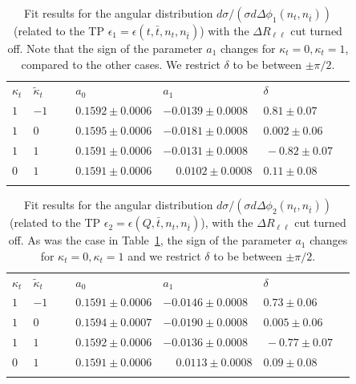 \documentclass[aps,preprint,tightenlines,floatfix,superscriptaddress,nofootinbib,showpacs]{revtex4-1}
\def\tbar{\bar{t}}
\def\kp{\kappa_t}
\begin{document}
\renewcommand{\arraystretch}{1.2}
\begin{table}[H]
\caption{Fit results for the angular distribution $d\sigma/(\sigma
  d\Delta\phi_1(n_t,n_{\tbar}))$ (related to the TP
  $\epsilon_1=\epsilon(t,\tbar,n_t,n_{\tbar})$) with the $\Delta
  R_{\ell\ell}$ cut turned off. Note that the sign of the parameter $a_1$
  changes for $\kp=0,\kp=1$, compared to the
  other cases.  We restrict $\delta$ to be between
    $\pm \pi/2$.}
\label{table3}
\begin{center}
\begin{tabular}{|C{1cm}|C{1cm}||C{3cm}|C{3cm}|C{3cm}|}
\hhline{|=====|}
$\kappa_t$&$\tilde{\kappa}_t$~~&$a_0$~~&$a_1$& $\delta$~~ \\ 
\hhline{|=====|} 
$1$ & $-1$~~~ & $0.1592 \pm 0.0006$ & $-0.0139 \pm 0.0008$ & $0.81 \pm 0.07$ \\[0.6mm]
\hline
$1$ & $0$ & $0.1595 \pm 0.0006$ & $-0.0181 \pm 0.0008$ & $0.002 \pm 0.06\,\,$ \\[0.6mm]
\hline
$1$ & $1$ & $0.1591 \pm 0.0006$ & $-0.0131 \pm 0.0008 $ & $\,-0.82 \pm 0.07\quad$  \\[0.6mm]
\hline
$0$ & $1$ & $0.1591 \pm 0.0006$ & ~~$\,0.0102 \pm 0.0008$ & $0.11 \pm 0.08$ \\
\hhline{|=====|}
\end{tabular}
\end{center} 
\end{table}
\begin{table}[H]
\caption{Fit results for the angular distribution $d\sigma/(\sigma
  d\Delta\phi_2(n_t,n_{\tbar}))$ (related to the TP
  $\epsilon_2=\epsilon(Q,\tbar,n_t,n_{\tbar})$), with the $\Delta
  R_{\ell\ell}$ cut turned off. As was the case in Table~\ref{table3},
  the sign of the parameter $a_1$ changes for
  $\kp=0,\kp=1$ and we restrict $\delta$ to be between
    $\pm \pi/2$.}
\label{table4}
\begin{center}
\begin{tabular}{|C{1cm}|C{1cm}||C{3cm}|C{3cm}|C{3cm}|}
\hhline{|=====|}
$\kappa_t$&$\tilde{\kappa}_t$~~&$a_0$~~&$a_1$& $\delta$~~ \\ 
\hhline{|=====|} 
$1$ & $-1$~~~ & $0.1591 \pm 0.0006$ & $-0.0146 \pm 0.0008$ & $0.73 \pm 0.06$ \\[0.6mm]
\hline
$1$ & $0$ & $0.1594 \pm 0.0007$ & $-0.0190 \pm 0.0008$ & $0.005 \pm 0.06\,\,$ \\[0.6mm]
\hline
$1$ & $1$ & $0.1592 \pm 0.0006$ & $-0.0136 \pm 0.0008 $ & $\,-0.77 \pm 0.07\quad$  \\[0.6mm]
\hline
$0$ & $1$ & $0.1591 \pm 0.0006$ & ~~$\,0.0113 \pm 0.0008$ & $0.09 \pm 0.08$ \\
\hhline{|=====|}
\end{tabular}
\end{center} 
\end{table}
\par
\end{document}
